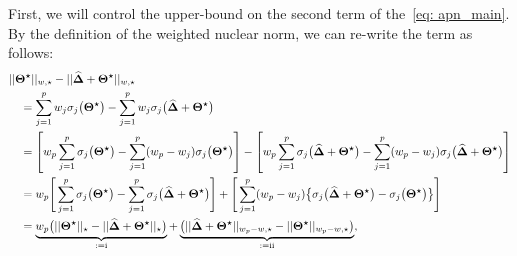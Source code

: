 \documentclass[12pt]{article}
\newcommand{\RN}[1]{%
  \textup{\uppercase\expandafter{\romannumeral#1}}%
}
\begin{document}
First, we will control the upper-bound on the second term of the~\eqref{eq: apn_main}.
By the definition of the weighted nuclear norm, we can re-write the term as follows:
\begin{align}
    & ||\boldsymbol{\Theta^{\star}}||_{w,\star} - ||\boldsymbol{\widehat{\Delta}} + \boldsymbol{\Theta^{\star}}||_{w,\star} \nonumber \\
    & \quad = \sum^{p}_{j = 1} w_{j}\sigma_{j}\big(\boldsymbol{\Theta^{\star}}\big) - \sum^{p}_{j = 1} w_{j}\sigma_{j}\big(\boldsymbol{\widehat{\Delta}} + \boldsymbol{\Theta^{\star}}\big)  \nonumber \\
    & \quad = \left[w_{p}\sum^{p}_{j = 1}\sigma_{j}\big(\boldsymbol{\Theta^{\star}}\big) - \sum^{p}_{j = 1}(w_{p} - w_{j})\sigma_{j}\big(\boldsymbol{\Theta^{\star}}\big)\right] - \left[w_{p}\sum^{p}_{j = 1}\sigma_{j}\big(\boldsymbol{\widehat{\Delta}} + \boldsymbol{\Theta^{\star}}\big) - \sum^{p}_{j = 1}(w_{p} - w_{j})\sigma_{j}\big(\boldsymbol{\widehat{\Delta}} + \boldsymbol{\Theta^{\star}}\big)\right] \nonumber \\
    & \quad = w_{p}\Bigg[ \sum^{p}_{j = 1}\sigma_{j}\big(\boldsymbol{\Theta^{\star}}\big) - \sum^{p}_{j = 1}\sigma_{j}\big(\boldsymbol{\widehat{\Delta}} + \boldsymbol{\Theta^{\star}}\big) \Bigg] + \Bigg[ \sum^{p}_{j=1}(w_{p} - w_{j})\big\{ \sigma_{j}\big(\boldsymbol{\widehat{\Delta}} + \boldsymbol{\Theta^{\star}}\big)-\sigma_{j}\big(\boldsymbol{\Theta^{\star}}\big)\big\}\Bigg] \nonumber\\
    & \quad = \underbrace{w_{p}\big( ||\boldsymbol{\Theta^{\star}}||_{\star} - ||\boldsymbol{\widehat{\Delta}} + \boldsymbol{\Theta^{\star}}||_{\star} \big)}_{:=\RN{1}} + \underbrace{\big( ||\boldsymbol{\widehat{\Delta}} + \boldsymbol{\Theta^{\star}}||_{w_{p}-w,\star} - ||\boldsymbol{\Theta^{\star}}||_{w_{p}-w,\star}\big)}_{:=\RN{2}}, \label{eq: wnn_diff}
\end{align}
\end{document}
